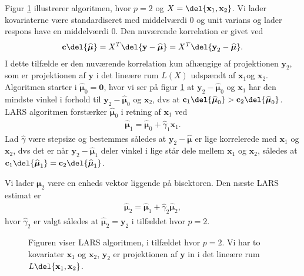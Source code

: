 Figur \ref{fig:lars} illustrerer algoritmen, hvor $p = 2$ og $X = \del{\textbf{x}_1, \textbf{x}_2}$. Vi lader kovariaterne være standardiseret med middelværdi 0 og unit varians og lader respons have en middelværdi 0. Den nuværende korrelation er givet ved 
\begin{align*}
\textbf{c}\del{\boldsymbol{\widehat{\mu}}} = X^T\del{\textbf{y} - \widehat{\boldsymbol{\mu}}} = X^T \del{ \textbf{y}_2 - \boldsymbol{\widehat{\mu}}}.
\end{align*}
I dette tilfælde er den nuværende korrelation kun afhængige af projektionen $\textbf{y}_2 $, som er projektionen af $\textbf{y}$ i det lineære rum $L(X)$ udspændt af $ \textbf{x}_1 $og $\textbf{x}_2$. 
Algoritmen starter i $\widehat{\boldsymbol{\mu}}_0 = \textbf{0}$, hvor vi ser på figur \ref{fig:lars} at $ \textbf{y}_2 - \boldsymbol{\widehat{\mu}}_0$ og $\textbf{x}_1$ har den mindste vinkel i forhold til $ \textbf{y}_2 - \boldsymbol{\widehat{\mu}}_0$  og $\textbf{x}_2$, dvs at $\textbf{c}_1\del{\boldsymbol{\widehat{\mu}}_0} > \textbf{c}_2\del{\boldsymbol{\widehat{\mu}}_0}$. 
LARS algoritmen forstærker  $\boldsymbol{\widehat{\mu}}_0$ i retning af $\textbf{x}_1$ ved
%
 \begin{align*}
 \boldsymbol{\widehat{\mu}}_1 = \boldsymbol{\widehat{\mu}}_0 + \widehat{\gamma}_1 \textbf{x}_1.
 \end{align*}
 Lad $\widehat{\gamma}$ være stepsize og bestemmes  således at $ \textbf{y}_2 - \boldsymbol{\widehat{\mu}}$ er lige korrelerede med $\textbf{x}_1$ og $\textbf{x}_2$, dvs det er når  $\textbf{y}_2 - \boldsymbol{\widehat{\mu}}_1$ deler vinkel i lige står dele mellem  $\textbf{x}_1$ og $\textbf{x}_2$, således at $\textbf{c}_1\del{\boldsymbol{\widehat{\mu}}_1} = \textbf{c}_2\del{\boldsymbol{\widehat{\mu}}_1}$.  
 
 Vi lader $\boldsymbol{\mu}_2$ være en enheds vektor liggende på bisektoren. Den næste LARS estimat er 
 \begin{align*}
 \boldsymbol{\widehat{\mu}}_2 = \boldsymbol{\widehat{\mu}}_1+ \widehat{\gamma}_2 \boldsymbol{\widehat{\mu}}_2,
 \end{align*}
%
hvor $\widehat{\gamma}_2$ er valgt således at  $ \boldsymbol{\widehat{\mu}}_2 = \textbf{y}_2$ i tilfældet hvor $p = 2$. 
\begin{figure}
\centering
 
\caption{Figuren viser LARS algoritmen, i tilfældet hvor $p = 2$. Vi har to kovariater  $\textbf{x}_1$ og $\textbf{x}_2$, $\textbf{y}_2$ er projektionen af $\textbf{y}$ in i det lineære rum $L  \del{ \textbf{x}_1, \textbf{x}_2} $. }\label{fig:lars}
\end{figure}

